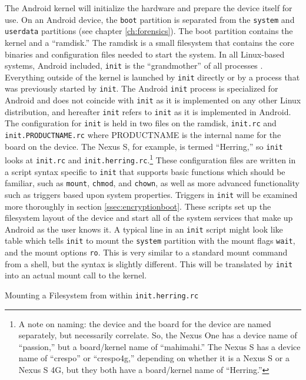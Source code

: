 The Android kernel will initialize the hardware and prepare the device itself for use. On an Android device, the \texttt{boot}
partition is separated from the \texttt{system} and \texttt{userdata} partitions (see chapter \ref{ch:forensics}). The boot
partition contains the kernel and a ``ramdisk.''  The ramdisk is a small filesystem that contains the core binaries and
configuration files needed to start the system. In all Linux-based systems, Android included, \texttt{init} is the ``grandmother''
of all processes \cite{EneaBoot}. Everything outside of the kernel is launched by \texttt{init} directly or by a process that was
previously started by \texttt{init}. The Android \texttt{init} process is specialized for Android and does not coincide with
\texttt{init} as it is implemented on any other Linux distribution, and hereafter \texttt{init} refers to \texttt{init} as it is
implemented in Android.  The configuration for \texttt{init} is held in two files on the ramdisk, \texttt{init.rc} and
\texttt{init.PRODUCTNAME.rc} where PRODUCTNAME is the internal name for the board on the device. The Nexus S, for example, is termed
``Herring,'' so \texttt{init} looks at \texttt{init.rc} and \texttt{init.herring.rc}.\footnote{A note on naming: the device and the
board for the device are named separately, but necessarily correlate. So, the Nexus One has a device name of ``passion,'' but a
board/kernel name of ``mahimahi.'' The Nexus S has a device name of ``crespo'' or ``crespo4g,'' depending on whether it is a Nexus S
or a Nexus S 4G, but they both have a board/kernel name of ``Herring.''} These configuration files are written in a script syntax
specific to \texttt{init} that supports basic functions which should be familiar, such as \texttt{mount}, \texttt{chmod}, and
\texttt{chown}, as well as more advanced functionality such as triggers based upon system properties.  Triggers in \texttt{init}
will be examined more thoroughly in section \ref{ssec:encryptionboot}. These scripts set up the filesystem layout of the device and
start all of the system services that make up Android as the user knows it. A typical line in an \texttt{init} script might look
like table which tells \texttt{init} to mount the \texttt{system} partition with the mount flags \texttt{wait}, and the mount
options \texttt{ro}. This is very similar to a standard mount command from a shell, but the syntax is slightly different. This will
be translated by \texttt{init} into an actual mount call to the kernel. 
\begin{table}

\caption{Mounting a Filesystem from within \texttt{init.herring.rc}}
\label{tab:initmount}
\end{table}


